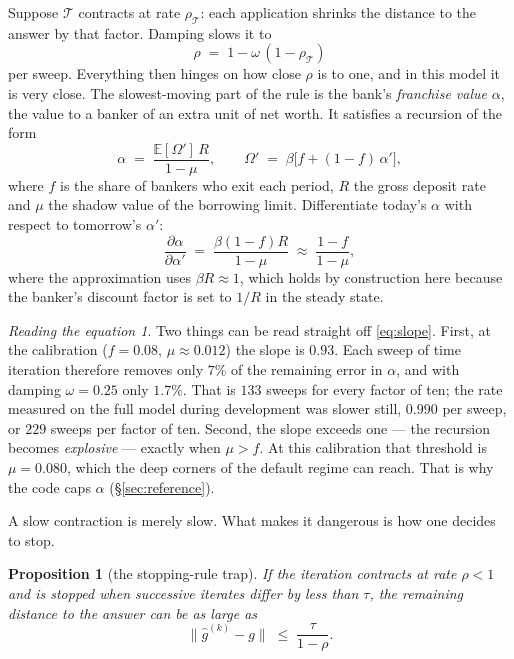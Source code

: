 \documentclass[10pt,a4paper]{article}
\theoremstyle{plain}
\newtheorem{prop}[thm]{Proposition}
\theoremstyle{remark}
\newtheorem*{reading}{Reading the equation}
\newcommand{\E}{\mathbb{E}}
\begin{document}
Suppose $\mathcal T$ contracts at rate $\rho_{\mathcal T}$: each application shrinks the
distance to the answer by that factor. Damping slows it to
\begin{equation}
  \rho \;=\; 1-\omega\,(1-\rho_{\mathcal T})
\end{equation}
per sweep. Everything then hinges on how close $\rho$ is to one, and in this model it is very
close. The slowest-moving part of the rule is the bank's \emph{franchise value} $\alpha$, the
value to a banker of an extra unit of net worth. It satisfies a recursion of the form
\begin{equation}
  \alpha \;=\; \frac{\E[\Omega']\,R}{1-\mu},\qquad
  \Omega' \;=\; \beta\big[f + (1-f)\,\alpha'\big],
  \label{eq:franchise}
\end{equation}
where $f$ is the share of bankers who exit each period, $R$ the gross deposit rate and $\mu$
the shadow value of the borrowing limit. Differentiate today's $\alpha$ with respect to
tomorrow's $\alpha'$:
\begin{equation}
  \frac{\partial\alpha}{\partial\alpha'} \;=\; \frac{\beta(1-f)R}{1-\mu}
  \;\approx\; \frac{1-f}{1-\mu},
  \label{eq:slope}
\end{equation}
where the approximation uses $\beta R\approx1$, which holds by construction here because the
banker's discount factor is set to $1/R$ in the steady state.

\begin{reading}
Two things can be read straight off \eqref{eq:slope}. First, at the calibration
($f=0.08$, $\mu\approx0.012$) the slope is $0.93$. Each sweep of time iteration therefore
removes only $7\%$ of the remaining error in $\alpha$, and with damping $\omega=0.25$ only
$1.7\%$. That is $133$ sweeps for every factor of ten; the rate measured on the full model
during development was slower still, $0.990$ per sweep, or $229$ sweeps per factor of ten.
Second, the slope exceeds one --- the recursion becomes \emph{explosive} --- exactly when
$\mu > f$. At this calibration that threshold is $\mu = 0.080$, which the deep corners of the
default regime can reach. That is why the code caps $\alpha$ (\S\ref{sec:reference}).
\end{reading}

\noindent A slow contraction is merely slow. What makes it dangerous is how one decides to
stop.

\begin{prop}[the stopping-rule trap]
\label{prop:stall}
If the iteration contracts at rate $\rho<1$ and is stopped when successive iterates differ by
less than $\tau$, the remaining distance to the answer can be as large as
\begin{equation}
  \|\hat g^{(k)} - g\| \;\le\; \frac{\tau}{1-\rho}.
\end{equation}
\end{prop}
\end{document}
